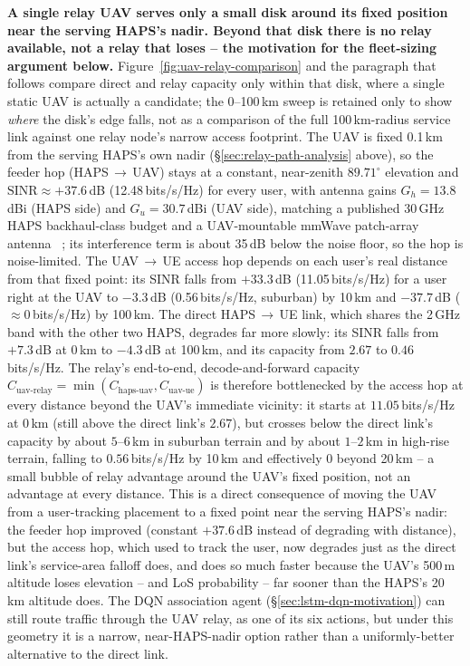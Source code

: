 \documentclass[conference]{IEEEtran}
\begin{document}
\noindent\textbf{A single relay UAV serves only a small disk around its fixed position near
the serving HAPS's nadir. Beyond that disk there is no relay available, not a relay that
loses -- the motivation for the fleet-sizing argument below.} Figure~\ref{fig:uav-relay-comparison}
and the paragraph that follows compare direct and relay capacity only within that disk,
where a single static UAV is actually a candidate; the 0--100\,km sweep is retained only to
show \emph{where} the disk's edge falls, not as a comparison of the full 100\,km-radius
service link against one relay node's narrow access footprint.
The UAV is fixed 0.1\,km from the serving HAPS's own nadir (\S\ref{sec:relay-path-analysis}
above), so the feeder hop (HAPS\,$\rightarrow$\,UAV) stays at a constant, near-zenith
$89.71^\circ$ elevation and $\mathrm{SINR}\approx+37.6$\,dB (12.48\,bits/s/Hz) for every user,
with antenna gains $G_h=13.8$\,dBi (HAPS side) and $G_u=30.7$\,dBi (UAV side), matching a
published 30\,GHz HAPS backhaul-class budget and a UAV-mountable mmWave patch-array antenna
~\cite{karaman2025haps,anim2021uav}; its interference term is about 35\,dB below the noise
floor, so the hop is noise-limited. The UAV\,$\rightarrow$\,UE access hop depends on each
user's real distance from that fixed point: its SINR falls from $+33.3$\,dB
(11.05\,bits/s/Hz) for a user right at the UAV to $-3.3$\,dB (0.56\,bits/s/Hz, suburban) by
10\,km and $-37.7$\,dB ($\approx$0\,bits/s/Hz) by 100\,km. The direct
HAPS\,$\rightarrow$\,UE link, which shares the 2\,GHz band with the other two HAPS, degrades
far more slowly: its SINR falls from $+7.3$\,dB at 0\,km to $-4.3$\,dB at 100\,km, and its
capacity from $2.67$ to $0.46$\,bits/s/Hz. The relay's end-to-end, decode-and-forward
capacity $C_{\text{uav-relay}}=\min(C_{\text{haps-uav}}, C_{\text{uav-ue}})$ is therefore
bottlenecked by the access hop at every distance beyond the UAV's immediate vicinity: it
starts at $11.05$\,bits/s/Hz at 0\,km (still above the direct link's $2.67$), but crosses
below the direct link's capacity by about $5$--$6$\,km in suburban terrain and by about
$1$--$2$\,km in high-rise terrain, falling to $0.56$\,bits/s/Hz by 10\,km and effectively
$0$ beyond 20\,km -- a small bubble of relay advantage around the UAV's fixed position,
not an advantage at every distance. This is a direct consequence of moving the UAV from a
user-tracking placement to a fixed point near the serving HAPS's nadir: the feeder hop
improved (constant $+37.6$\,dB instead of degrading with distance), but the access hop,
which used to track the user, now degrades just as the direct link's service-area falloff
does, and does so much faster because the UAV's 500\,m altitude loses elevation -- and LoS
probability -- far sooner than the HAPS's 20\,km altitude does. The DQN association agent
(\S\ref{sec:lstm-dqn-motivation}) can still route traffic through the UAV relay, as one of
its six actions, but under this geometry it is a narrow, near-HAPS-nadir option rather than
a uniformly-better alternative to the direct link.
\end{document}
